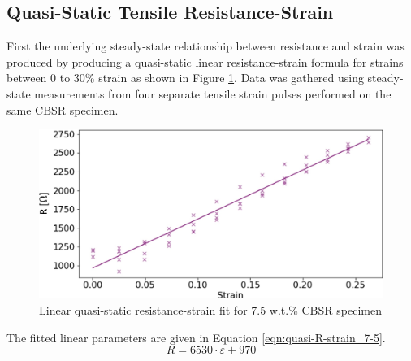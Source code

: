 \subsection{Quasi-Static Tensile Resistance-Strain}
\label{subsec:Quasi-Static Tensile Resistance-Strain}
First the underlying steady-state relationship between resistance and strain was produced by producing a quasi-static linear resistance-strain formula for strains between 0 to 30\% strain as shown in Figure \ref{fig:quasi_static_tensile}. Data was gathered using steady-state measurements from four separate tensile strain pulses performed on the same CBSR specimen.
\begin{figure}[H]
	\centering
	\includegraphics[width=0.8\linewidth]{Figures/2_7-5_4Epin_20mm_v2_Quasi_static_fit.jpg}
	\caption{Linear quasi-static resistance-strain fit for 7.5 w.t.\% CBSR specimen}
	\label{fig:quasi_static_tensile}
\end{figure}
The fitted linear parameters are given in Equation \ref{eqn:quasi-R-strain_7-5}.
\begin{equation}
	R = 6530 \cdot \varepsilon + 970
	\label{eqn:quasi-R-strain_7-5}
\end{equation}



